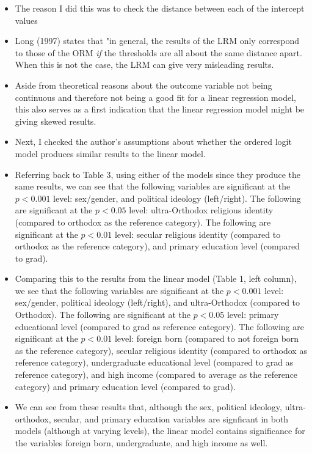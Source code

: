 \documentclass[12pt,letterpaper]{article}
\begin{document}
\begin{itemize}
		\item The reason I did this was to check the distance between each of the intercept values
		\item Long (1997) states that "in general, the results of the LRM only correspond to those of the ORM \textit{if} the thresholds are all about the same distance apart. When this is not the case, the LRM can give very misleading results. 
		\item Aside from theoretical reasons about the outcome variable not being continuous and therefore not being a good fit for a linear regression model, this also serves as a first indication that the linear regression model might be giving skewed results.
		\item Next, I checked the author's assumptions about whether the ordered logit model  produces similar results to the linear model.
		\item Referring back to Table 3, using either of the models since they produce the same results, we can see that the following variables are significant at the $p<0.001$ level: sex/gender, and political ideology (left/right). The following are significant at the $p<0.05$ level: ultra-Orthodox religious identity (compared to orthodox as the reference category). The following are significant at the $p<0.01$ level: secular religious identity (compared to orthodox as the reference category), and primary education level (compared to grad).
		\item Comparing this to the results from the linear model (Table 1, left column), we see that the following variables are significant at the $p<0.001$ level: sex/gender, political ideology (left/right), and ultra-Orthodox (compared to Orthodox). The following are significant at the $p<0.05$ level: primary educational level (compared to grad as reference category). The following are significant at the $p<0.01$ level: foreign born (compared to not foreign born as the reference category), secular religious identity (compared to orthodox as reference category), undergraduate educational level (compared to grad as reference category), and high income (compared to average as the reference category) and primary education level (compared to grad).
		\item We can see from these results that, although the sex, political ideology, ultra-orthodox, secular, and primary education variables are signficant in both models (although at varying levels), the linear model contains significance for the variables foreign born, undergraduate, and high income as well.

\end{itemize}
\end{document}
